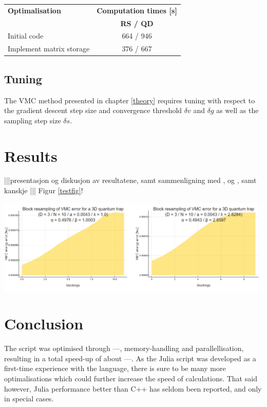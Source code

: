 \documentclass[a4paper,8pt]{article}
\begin{document}
\begin{multicols}{2}
\begin{center}
\begin{tabular}{lc}
	\hline
	\textbf{Optimalisation} & \textbf{Computation times [s]} \\
	 & \textbf{RS / QD}\\
	\hline
    Initial code & 664 / 946 \\
    Implement matrix storage & 376 / 667 \\
    \hline
\end{tabular}
\label{optTimes}
\end{center}


\subsection{Tuning}\label{tuning}
The VMC method presented in chapter \ref{theory} requires tuning with respect to the gradient descent step size and convergence threshold $\delta v$ and $\delta g$ as well as the sampling step size $\delta s$.


\section{Results}\label{results}
|||presentasjon og diskusjon av resultatene, samt sammenligning med \cite{SWL}, \cite{DBG} og \cite{DS}, samt kanskje \cite{NMPGHJP}||| Figur \ref{testfig}!

\begin{center}
\includegraphics[width=\columnwidth]{figResampling}
\label{testfig}
\end{center}

\section{Conclusion}
The script was optimised through ---, memory-handling and parallellisation, resulting in a total speed-up of about ---. As the Julia script was developed as a first-time experience with the language, there is sure to be many more optimalisations which could further increase the speed of calculations. That said however, Julia performance better than C++ has seldom been reported, and only in special cases.


\end{multicols}


\end{document}
